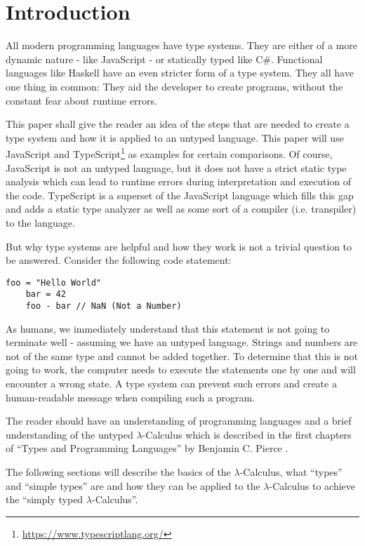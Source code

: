\section{Introduction}

All modern programming languages have type systems.
They are either of a more dynamic nature - like JavaScript -
or statically typed like C\#. Functional languages like Haskell have
an even stricter form of a type system. They all have one thing in
common: They aid the developer to create programs, without the
constant fear about runtime errors.

This paper shall give the reader an idea of the steps that
are needed to create a type system and how it is applied to
an untyped language. This paper will use JavaScript and TypeScript\footnote{\url{https://www.typescriptlang.org/}}
as examples for certain comparisons.
Of course, JavaScript is not an untyped language, but
it does not have a strict static type analysis which can lead
to runtime errors during interpretation and execution of the code.
TypeScript is a superset of the JavaScript language which fills this
gap and adds a static type analyzer as well as some sort of a compiler
(i.e. transpiler) to the language.

But why type systems are helpful and how they work
is not a trivial question to be answered. Consider
the following code statement:

\begin{lstlisting}[caption={Runtime error}, captionpos=b]
    foo = "Hello World"
    bar = 42
    foo - bar // NaN (Not a Number)
\end{lstlisting}

As humans, we immediately understand that this statement
is not going to terminate well - assuming we have an untyped
language. Strings and numbers are not
of the same type and cannot be added together. To determine
that this is not going to work, the computer needs to execute
the statements one by one and will encounter a wrong state.
A type system can prevent such errors and create a
human-readable message when compiling such a program.

The reader should have an understanding of programming
languages and a brief understanding of the untyped
$\lambda$-Calculus which is described in the first
chapters of ``Types and Programming Languages'' by
Benjamin C. Pierce \cite{pierce2002ProgLang}.

The following sections will describe the basics of the
$\lambda$-Calculus, what ``types'' and ``simple types'' are
and how they can be applied to the $\lambda$-Calculus to
achieve the ``simply typed $\lambda$-Calculus''.
